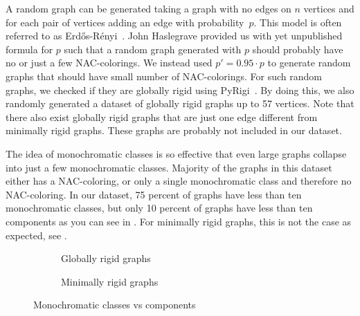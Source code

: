 A random graph can be generated taking a graph with no edges on \( n \) vertices
and for each pair of vertices adding an edge with probability~\( p \).
This model is often referred to as Erdős-Rényi~\cite{random_gnp}.
%
John Haslegrave provided us with yet unpublished formula for \( p \)
such that a random graph generated with \( p \)
should probably have no or just a few NAC-colorings.
%
We instead used \( p' = 0.95\cdot p \) to generate random graphs that
should have small number of NAC-colorings.
For such random graphs, we checked if they are globally rigid using PyRigi~\cite{pyrigi}.
%
By doing this, we also randomly generated a dataset of globally rigid graphs
up to 57 vertices.
%
Note that there also exist globally rigid graphs
that are just one edge different from minimally rigid graphs.
These graphs are probably not included in our dataset.

The idea of monochromatic classes is so effective
that even large graphs collapse into just a few monochromatic classes.
Majority of the graphs in this dataset either has a NAC-coloring,
or only a single monochromatic class and therefore no NAC-coloring.
In our dataset, 75 percent of graphs have less than ten	monochromatic classes,
but only 10 percent of graphs have less than ten \trcon{} components
as you can see in .
For minimally rigid graphs, this is not the case as expected, see
.
%
\begin{figure}[h!]
	\centering
	\begin{subfigure}{0.48\textwidth}
		\centering
		\scalebox{0.6}{}
		\caption[Monoch. classes vs tr. con. components for globally rigid]{%
			\centering Globally rigid graphs}%
		\label{fig:monochrom_vs_triangle_globally_rigid}
	\end{subfigure}
	\hfill
	\begin{subfigure}{0.48\textwidth}
		\centering
		\scalebox{0.6}{}
		\caption[Monoch. classes vs tr. con. components for minimally rigid]{%
			\centering Minimally rigid graphs}%
		\label{fig:monochrom_vs_triangle_minimally_rigid}
	\end{subfigure}
	\caption{Monochromatic classes vs \trcon{} components}%
	\label{fig:monochrom_vs_triangle}
\end{figure}

